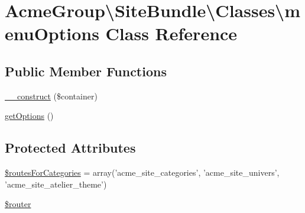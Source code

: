 \hypertarget{class_acme_group_1_1_site_bundle_1_1_classes_1_1menu_options}{\section{Acme\+Group\textbackslash{}Site\+Bundle\textbackslash{}Classes\textbackslash{}menu\+Options Class Reference}
\label{class_acme_group_1_1_site_bundle_1_1_classes_1_1menu_options}
}
\subsection*{Public Member Functions}
\begin{DoxyCompactItemize}
\item 
\hyperlink{class_acme_group_1_1_site_bundle_1_1_classes_1_1menu_options_a50af4be633cb846099e2f0bbb9bf188c}{\+\_\+\+\_\+construct} (\$container)
\item 
\hyperlink{class_acme_group_1_1_site_bundle_1_1_classes_1_1menu_options_a209ecaeccb408cbdeb84086fd47e4d22}{get\+Options} ()
\end{DoxyCompactItemize}
\subsection*{Protected Attributes}
\begin{DoxyCompactItemize}
\item 
\hyperlink{class_acme_group_1_1_site_bundle_1_1_classes_1_1menu_options_ad4183f357d70f8ef3b000340d84c7082}{\$routes\+For\+Categories} = array('acme\+\_\+site\+\_\+categories', 'acme\+\_\+site\+\_\+univers', 'acme\+\_\+site\+\_\+atelier\+\_\+theme')
\item 
\hyperlink{class_acme_group_1_1_site_bundle_1_1_classes_1_1menu_options_a813d60ba241236808bc5610ad7ec9803}{\$router}
\end{DoxyCompactItemize}


